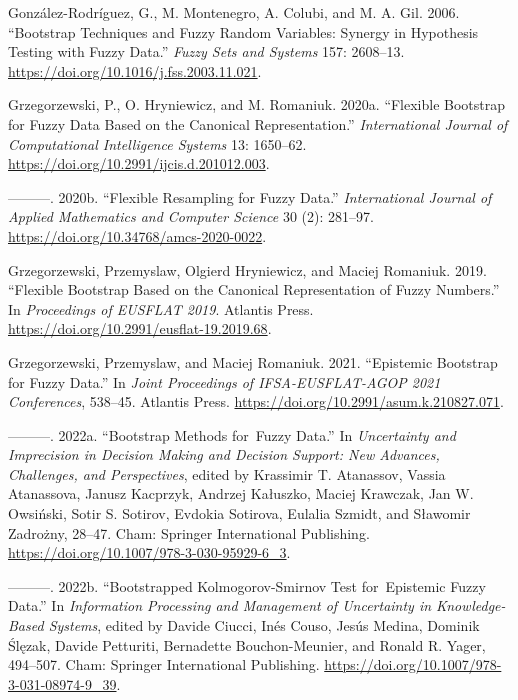 \begin{CSLReferences}{1}{0}
\leavevmode{}%
González-Rodríguez, G., M. Montenegro, A. Colubi, and M. A. Gil. 2006. {``Bootstrap Techniques and Fuzzy Random Variables: Synergy in Hypothesis Testing with Fuzzy Data.''} \emph{Fuzzy Sets and Systems} 157: 2608--13. \url{https://doi.org/10.1016/j.fss.2003.11.021}.

\leavevmode{}%
Grzegorzewski, P., O. Hryniewicz, and M. Romaniuk. 2020a. {``Flexible Bootstrap for Fuzzy Data Based on the Canonical Representation.''} \emph{International Journal of Computational Intelligence Systems} 13: 1650--62. \url{https://doi.org/10.2991/ijcis.d.201012.003}.

\leavevmode{}%
---------. 2020b. {``Flexible Resampling for Fuzzy Data.''} \emph{International Journal of Applied Mathematics and Computer Science} 30 (2): 281--97. \url{https://doi.org/10.34768/amcs-2020-0022}.

\leavevmode{}%
Grzegorzewski, Przemyslaw, Olgierd Hryniewicz, and Maciej Romaniuk. 2019. {``Flexible Bootstrap Based on the Canonical Representation of Fuzzy Numbers.''} In \emph{Proceedings of EUSFLAT 2019}. Atlantis Press. \url{https://doi.org/10.2991/eusflat-19.2019.68}.

\leavevmode{}%
Grzegorzewski, Przemyslaw, and Maciej Romaniuk. 2021. {``Epistemic Bootstrap for Fuzzy Data.''} In \emph{Joint Proceedings of IFSA-EUSFLAT-AGOP 2021 Conferences}, 538--45. Atlantis Press. \url{https://doi.org/10.2991/asum.k.210827.071}.

\leavevmode{}%
---------. 2022a. {``Bootstrap Methods for~Fuzzy Data.''} In \emph{Uncertainty and Imprecision in Decision Making and Decision Support: New Advances, Challenges, and Perspectives}, edited by Krassimir T. Atanassov, Vassia Atanassova, Janusz Kacprzyk, Andrzej Kałuszko, Maciej Krawczak, Jan W. Owsiński, Sotir S. Sotirov, Evdokia Sotirova, Eulalia Szmidt, and Sławomir Zadrożny, 28--47. Cham: Springer International Publishing. \url{https://doi.org/10.1007/978-3-030-95929-6_3}.

\leavevmode{}%
---------. 2022b. {``Bootstrapped {K}olmogorov-{S}mirnov Test for~Epistemic Fuzzy Data.''} In \emph{Information Processing and Management of Uncertainty in Knowledge-Based Systems}, edited by Davide Ciucci, Inés Couso, Jesús Medina, Dominik Ślęzak, Davide Petturiti, Bernadette Bouchon-Meunier, and Ronald R. Yager, 494--507. Cham: Springer International Publishing. \url{https://doi.org/10.1007/978-3-031-08974-9_39}.


\end{CSLReferences}
